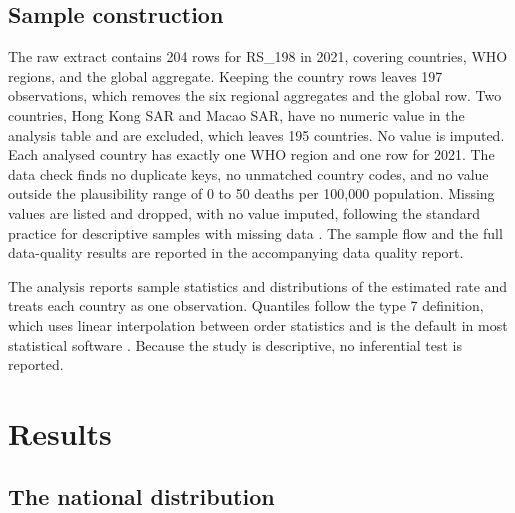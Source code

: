 \documentclass[12pt]{article}
\begin{document}
\subsection{Sample construction}

The raw extract contains 204 rows for RS\_198 in 2021, covering countries, WHO regions, and the global aggregate. Keeping the country rows leaves 197 observations, which removes the six regional aggregates and the global row.
Two countries, Hong Kong SAR and Macao SAR, have no numeric value in the analysis table and are excluded, which leaves 195 countries. No value is imputed.
Each analysed country has exactly one WHO region and one row for 2021. The data check finds no duplicate keys, no unmatched country codes, and no value outside the plausibility range of 0 to 50 deaths per 100,000 population. Missing values are listed and dropped, with no value imputed, following the standard practice for descriptive samples with missing data \citep{little2019statistical}. The sample flow and the full data-quality results are reported in the accompanying data quality report.

The analysis reports sample statistics and distributions of the estimated rate and treats each country as one observation. Quantiles follow the type 7 definition, which uses linear interpolation between order statistics and is the default in most statistical software \citep{hyndman1996sample}. Because the study is descriptive, no inferential test is reported.

\section{Results}

\subsection{The national distribution}
\end{document}
